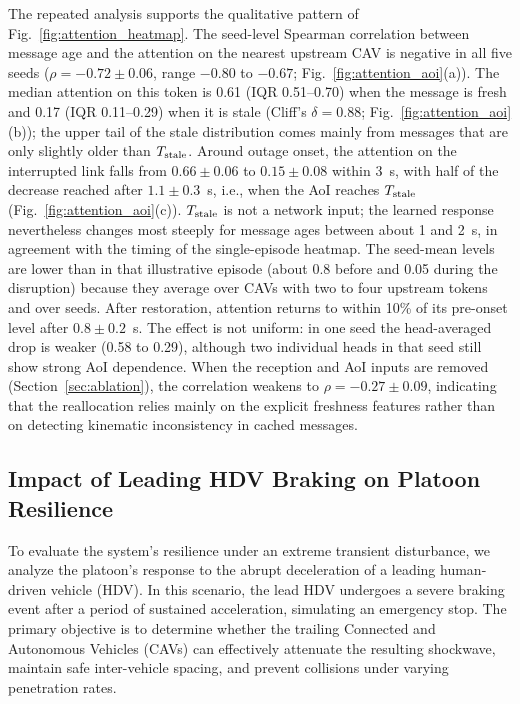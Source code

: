 \documentclass{ieeeaccess}
\begin{document}
The repeated analysis supports the qualitative pattern of Fig.~\ref{fig:attention_heatmap}. The seed-level Spearman correlation between message age and the attention on the nearest upstream CAV is negative in all five seeds ($\rho=-0.72\pm0.06$, range $-0.80$ to $-0.67$; Fig.~\ref{fig:attention_aoi}(a)). The median attention on this token is 0.61 (IQR 0.51--0.70) when the message is fresh and 0.17 (IQR 0.11--0.29) when it is stale (Cliff's $\delta=0.88$; Fig.~\ref{fig:attention_aoi}(b)); the upper tail of the stale distribution comes mainly from messages that are only slightly older than $T_{\rm stale}$. Around outage onset, the attention on the interrupted link falls from $0.66\pm0.06$ to $0.15\pm0.08$ within 3~s, with half of the decrease reached after $1.1\pm0.3$~s, i.e., when the AoI reaches $T_{\rm stale}$ (Fig.~\ref{fig:attention_aoi}(c)). $T_{\rm stale}$ is not a network input; the learned response nevertheless changes most steeply for message ages between about 1 and 2~s, in agreement with the timing of the single-episode heatmap. The seed-mean levels are lower than in that illustrative episode (about 0.8 before and 0.05 during the disruption) because they average over CAVs with two to four upstream tokens and over seeds. After restoration, attention returns to within 10\% of its pre-onset level after $0.8\pm0.2$~s. The effect is not uniform: in one seed the head-averaged drop is weaker (0.58 to 0.29), although two individual heads in that seed still show strong AoI dependence. When the reception and AoI inputs are removed (Section~\ref{sec:ablation}), the correlation weakens to $\rho=-0.27\pm0.09$, indicating that the reallocation relies mainly on the explicit freshness features rather than on detecting kinematic inconsistency in cached messages. %

\subsection{Impact of Leading HDV Braking on Platoon Resilience}
\label{sec:braking_effects}

To evaluate the system's resilience under an extreme transient disturbance, we analyze the platoon's response to the abrupt deceleration of a leading human-driven vehicle (HDV). In this scenario, the lead HDV undergoes a severe braking event after a period of sustained acceleration, simulating an emergency stop. The primary objective is to determine whether the trailing Connected and Autonomous Vehicles (CAVs) can effectively attenuate the resulting shockwave, maintain safe inter-vehicle spacing, and prevent collisions under varying penetration rates.
\end{document}
